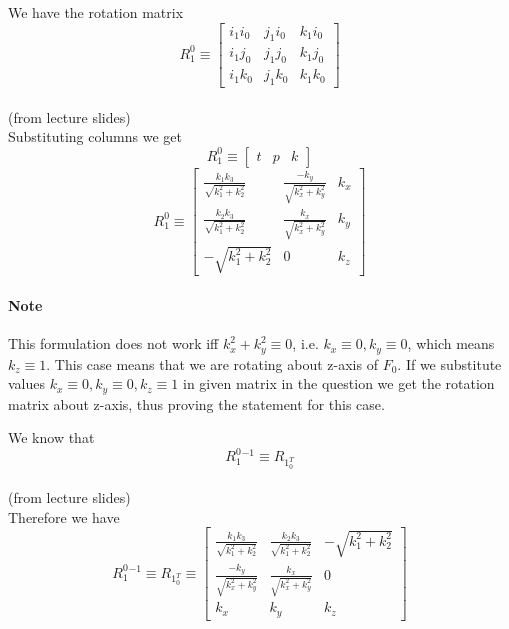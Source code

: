 \documentclass[12pt]{article}
\newcommand{\fromlectures}{{\\ \color{blue} \hspace*{\fill}(from lecture slides)} \\}
\begin{document}
We have the rotation matrix
\[
  R_1^0 \equiv \begin{bmatrix} i_1i_0 & j_1i_0 & k_1i_0 \\ i_1j_0 & j_1j_0 & k_1j_0 \\ i_1k_0 & j_1k_0 & k_1k_0 \end{bmatrix}
\]
\fromlectures
Substituting columns we get
\[
  R_1^0 \equiv \begin{bmatrix} t & p & k \end{bmatrix}
\]
\[
  R_1^0 \equiv
  \begin{bmatrix}
  \frac{k_1k_3}{\sqrt{k_1^2 + k_2^2}} & \frac{-k_y}{\sqrt{k_x^2 + k_y^2}}  & k_x \\
  \frac{k_2k_3}{\sqrt{k_1^2 + k_2^2}} & \frac{k_x}{\sqrt{k_x^2 + k_y^2}}   & k_y \\
  -\sqrt{k_1^2 + k_2^2}               & 0 & k_z
  \end{bmatrix}
\]

\paragraph{Note} This formulation does not work iff $ k_x^2 + k_y^2 \equiv 0 $, i.e. $ k_x \equiv 0, k_y \equiv 0 $, which means $ k_z \equiv 1 $.
This case means that we are rotating about z-axis of $ F_0 $.
If we substitute values $ k_x \equiv 0, k_y \equiv 0, k_z \equiv 1 $ in given matrix in the question we get the rotation matrix about z-axis, thus proving the statement for this case.

We know that
\[
  R_1^0^{-1} \equiv R_1_0^T
\]
\fromlectures
Therefore we have
\[
  R_1^0^{-1} \equiv R_1_0^T \equiv
  \begin{bmatrix}
  \frac{k_1k_3}{\sqrt{k_1^2 + k_2^2}} & \frac{k_2k_3}{\sqrt{k_1^2 + k_2^2}} & -\sqrt{k_1^2 + k_2^2} \\
  \frac{-k_y}{\sqrt{k_x^2 + k_y^2}}  & \frac{k_x}{\sqrt{k_x^2 + k_y^2}}   & 0 \\
  k_x & k_y & k_z
  \end{bmatrix}
\]

\section{}
\section{}
\section{}
\section{}
\end{document}
